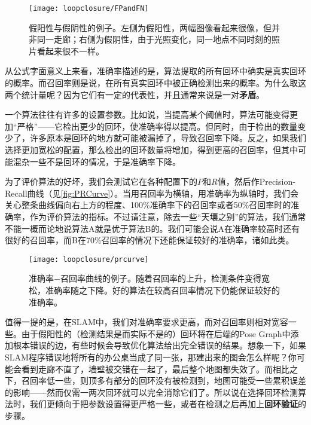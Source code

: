\vspace{-\medskipamount}
\begin{figure}[!htp]
	\centering
	\texttt{[image: loopclosure/FPandFN]}
	\caption{假阳性与假阴性的例子。左侧为假阳性，两幅图像看起来很像，但并非同一走廊；右侧为假阴性，由于光照变化，同一地点不同时刻的照片看起来很不一样。}
	\label{fig:FPandFN}
\end{figure}

从公式字面意义上来看，准确率描述的是，算法提取的所有回环中确实是真实回环的概率。而召回率则是说，在所有真实回环中被正确检测出来的概率。为什么取这两个统计量呢？因为它们有一定的代表性，并且通常来说是一对\textbf{矛盾}。

一个算法往往有许多的设置参数。比如说，当提高某个阈值时，算法可能变得更加“严格”——它检出更少的回环，使准确率得以提高。但同时，由于检出的数量变少了，许多原本是回环的地方就可能被漏掉了，导致召回率下降。反之，如果我们选择更加宽松的配置，那么检出的回环数量将增加，得到更高的召回率，但其中可能混杂一些不是回环的情况，于是准确率下降。

为了评价算法的好坏，我们会测试它在各种配置下的$P$和$R$值，然后作Precision-Recall曲线（见\autoref{fig:PRCurve}）。当用召回率为横轴，用准确率为纵轴时，我们会关心整条曲线偏向右上方的程度、100\%准确率下的召回率或者50\%召回率时的准确率，作为评价算法的指标。不过请注意，除去一些“天壤之别”的算法，我们通常不能一概而论地说算法A就是优于算法B的。我们可能会说A在准确率较高时还有很好的召回率，而B在70\%召回率的情况下还能保证较好的准确率，诸如此类。

\begin{figure}[!ht]
	\centering
	\texttt{[image: loopclosure/prcurve]}
	\caption{准确率−召回率曲线的例子\textsuperscript{\cite{Gao2015a}}。随着召回率的上升，检测条件变得宽松，准确率随之下降。好的算法在较高召回率情况下仍能保证较好的准确率。}
	\label{fig:PRCurve}
\end{figure}

值得一提的是，在SLAM中，我们对准确率要求更高，而对召回率则相对宽容一些。由于假阳性的（检测结果是而实际不是的）回环将在后端的Pose  Graph中添加根本错误的边，有些时候会导致优化算法给出完全错误的结果。想象一下，如果SLAM程序错误地将所有的办公桌当成了同一张，那建出来的图会怎么样呢？你可能会看到走廊不直了，墙壁被交错在一起了，最后整个地图都失效了。而相比之下，召回率低一些，则顶多有部分的回环没有被检测到，地图可能受一些累积误差的影响——然而仅需一两次回环就可以完全消除它们了。所以说在选择回环检测算法时，我们更倾向于把参数设置得更严格一些，或者在检测之后再加上\textbf{回环验证}的步骤。


